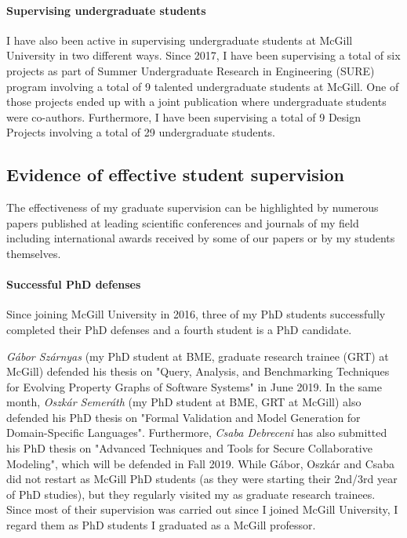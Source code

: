 \paragraph{Supervising undergraduate students}
I have also been active in supervising undergraduate students at McGill University in two different ways.  Since 2017, I have been supervising a total of six projects as part of Summer Undergraduate Research in Engineering (SURE) program involving a total of 9 talented undergraduate students at McGill. One of those projects ended up with a joint publication where undergraduate students were co-authors. Furthermore, I have been supervising a total of 9 Design Projects involving a total of 29 undergraduate students. 

\subsection{Evidence of effective student supervision}

The effectiveness of my graduate supervision can be highlighted by numerous papers published at leading scientific 
conferences and journals of my field including international awards received by some of our papers or by my students 
themselves. 

\paragraph{Successful PhD defenses}
Since joining McGill University in 2016, three of my PhD students successfully completed their PhD defenses and a fourth student is a PhD candidate. 

\emph{Gábor Szárnyas} (my PhD student at BME, graduate research trainee (GRT) at McGill) defended his thesis on "Query, Analysis, and Benchmarking Techniques for Evolving Property Graphs of Software Systems" in June 2019. In the same month, \emph{Oszkár Semeráth} (my PhD student at BME, GRT at McGill) also defended his PhD thesis on "Formal Validation and Model Generation for Domain-Specific Languages". Furthermore, \emph{Csaba Debreceni} has also submitted his PhD thesis on "Advanced Techniques and Tools for Secure Collaborative Modeling", which will be defended in Fall 2019. 
While Gábor, Oszkár and Csaba did not restart as McGill PhD students (as they were starting their 2nd/3rd year of PhD studies), but they regularly visited my as graduate research trainees. Since most of their supervision was carried out since I joined McGill University, I regard them as PhD students I graduated as a McGill professor. 

